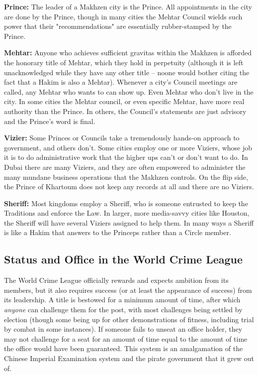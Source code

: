 \textbf{Prince:} The leader of a Makhzen city is the Prince. All appointments in the city are done by the Prince, though in many cities the Mehtar Council wields such power that their "recommendations" are essentially rubber-stamped by the Prince.

\textbf{Mehtar:} Anyone who achieves sufficient gravitas within the Makhzen is afforded the honorary title of Mehtar, which they hold in perpetuity (although it is left unacknowledged while they have any other title -- noone would bother citing the fact that a Hakim is also a Mehtar). Whenever a city's Council meetings are called, any Mehtar who wants to can show up. Even Mehtar who don't live in the city. In some cities the Mehtar council, or even specific Mehtar, have more real authority than the Prince. In others, the Council's statements are just advisory and the Prince's word is final.

\textbf{Vizier:} Some Princes or Councils take a tremendously hands-on approach to government, and others don't. Some cities employ one or more Viziers, whose job it is to do administrative work that the higher ups can't or don't want to do. In Dubai there are many Viziers, and they are often empowered to administer the many mundane business operations that the Makhzen controls. On the flip side, the Prince of Khartoum does not keep any records at all and there are no Viziers.

\textbf{Sheriff:} Most kingdoms employ a Sheriff, who is someone entrusted to keep the Traditions and enforce the Law. In larger, more media-savvy cities like Houston, the Sheriff will have several Viziers assigned to help them. In many ways a Sheriff is like a Hakim that answers to the Princeps rather than a Circle member.

\subsection{Status and Office in the World Crime League} 

The World Crime League officially rewards and expects ambition from its members, but it also requires success (or at least the appearance of success) from its leadership. A title is bestowed for a minimum amount of time, after which \textit{anyone} can challenge them for the post, with most challenges being settled by election (though some being up for other demonstrations of fitness, including trial by combat in some instances). If someone fails to unseat an office holder, they may not challenge for a seat for an amount of time equal to the amount of time the office would have been guaranteed. This system is an amalgamation of the Chinese Imperial Examination system and the pirate government that it grew out of.

